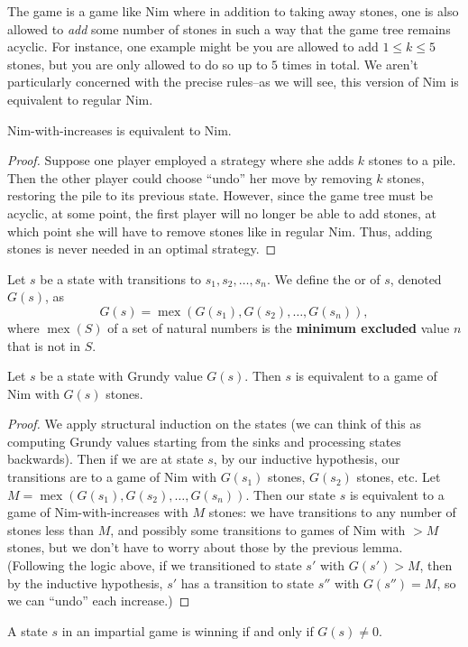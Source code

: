 \documentclass[11pt]{scrartcl}
\DeclareMathOperator{\mex}{mex}
\begin{document}
\begin{definition}
  \begin{definition}
    The game  is a game like Nim where in addition to taking away stones, one is also allowed to \textit{add} some number of stones in such a way that the game tree remains acyclic.
    For instance, one example might be you are allowed to add $1 \leq k \leq 5$ stones, but you are only allowed to do so up to $5$ times in total.
    We aren't particularly concerned with the precise rules--as we will see, this version of Nim is equivalent to regular Nim.
  \end{definition}
  \begin{lemma}
   Nim-with-increases is equivalent to Nim. 
  \end{lemma}
  \begin{proof}
    Suppose one player employed a strategy where she adds $k$ stones to a pile.
    Then the other player could choose ``undo'' her move by removing $k$ stones, restoring the pile to its previous state.
    However, since the game tree must be acyclic, at some point, the first player will no longer be able to add stones, at which point she will have to remove stones like in regular Nim.
    Thus, adding stones is never needed in an optimal strategy.
  \end{proof}
  \begin{definition}
  Let $s$ be a state with transitions to $s_1, s_2, \dots, s_n$.
    We define the  or  of $s$, denoted $G(s)$, as
    \[
      G(s) = \mex(G(s_1), G(s_2), \dots, G(s_n)),
    \]
    where $\mex(S)$ of a set of natural numbers is the \textbf{minimum excluded} value $n$ that is not in $S$.
  \end{definition}
  \begin{theorem}
    Let $s$ be a state with Grundy value $G(s)$.
    Then $s$ is equivalent to a game of Nim with $G(s)$ stones.
  \end{theorem}
  \begin{proof}
    We apply structural induction on the states (we can think of this as computing Grundy values starting from the sinks and processing states backwards).
    Then if we are at state $s$, by our inductive hypothesis, our transitions are to a game of Nim with $G(s_1)$ stones, $G(s_2)$ stones, etc.
    Let $M = \mex(G(s_1), G(s_2), \dots, G(s_n))$.
    Then our state $s$ is equivalent to a game of Nim-with-increases with $M$ stones: we have transitions to any number of stones less than $M$, and possibly some transitions to games of Nim with $> M$ stones, but we don't have to worry about those by the previous lemma.
    (Following the logic above, if we transitioned to state $s'$ with $G(s') > M$, then by the inductive hypothesis, $s'$ has a transition to state $s''$ with $G(s'') = M$, so we can ``undo'' each increase.)
  \end{proof}
  \begin{corollary}
    A state $s$ in an impartial game is winning if and only if $G(s) \neq 0$.
  \end{corollary}


\end{definition}
\end{document}
